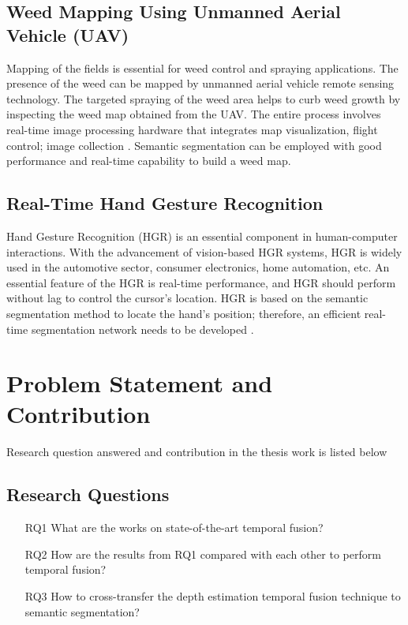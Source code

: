 	\subsection{Weed Mapping Using Unmanned Aerial Vehicle (UAV)}
	
	Mapping of the fields is essential for weed control and spraying applications. The presence of the weed can be mapped by unmanned aerial vehicle remote sensing technology. The targeted spraying of the weed area helps to curb weed growth by inspecting the weed map obtained from the UAV. The entire process involves real-time image processing hardware that integrates map visualization, flight control; image collection \cite{33_deng2020lightweight}. Semantic segmentation can be employed with good performance and real-time capability to build a weed map. 
	
	\subsection{Real-Time Hand Gesture Recognition}
	
	Hand Gesture Recognition (HGR) is an essential component in human-computer interactions. With the advancement of vision-based HGR systems, HGR is widely used in the automotive sector, consumer electronics, home automation, etc. An essential feature of the HGR is real-time performance, and HGR should perform without lag to control the cursor's location. HGR is based on the semantic segmentation method to locate the hand's position; therefore, an efficient real-time segmentation network needs to be developed \cite{34_hsieh2010real}.  
	
	\vspace{65mm} %
	
    \section{Problem Statement and Contribution}
    
    Research question answered and contribution in the thesis work is listed below
    \subsection{Research Questions}
    
     \begin{itemize}
    	\setlength\itemsep{0.01em}
    	\item[RQ1] What are the works on state-of-the-art temporal fusion?
    	\item[RQ2] How are the results from RQ1 compared with each other to perform temporal
    	fusion?
    	\item[RQ3] How to cross-transfer the depth estimation temporal fusion technique to semantic segmentation?
    \end{itemize}
    

